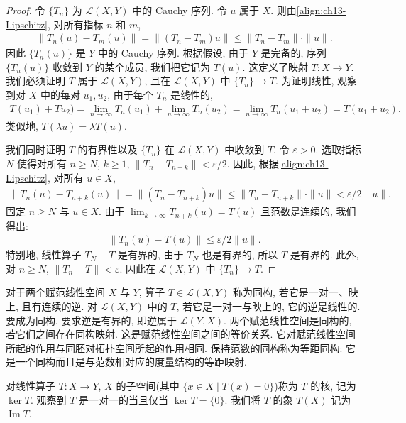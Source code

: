 \documentclass[../../main.tex]{subfiles}
\begin{document}
\begin{proof}
令 $\{T_{n}\}$ 为 $\mathcal{L}(X,Y)$ 中的 Cauchy 序列. 令 $u$ 属于 $X$. 则由\eqref{align:ch13-Lipschitz}, 对所有指标 $n$ 和 $m$,
\begin{align*}
\|T_{n}(u)-T_{m}(u)\|=\|(T_{n}-T_{m})u\|\leqslant\|T_{n}-T_{m}\|\cdot\|u\|.
\end{align*}
因此 $\{T_{n}(u)\}$ 是 $Y$ 中的 Cauchy 序列. 根据假设, 由于 $Y$ 是完备的, 序列 $\{T_{n}(u)\}$ 收敛到 $Y$ 的某个成员, 我们把它记为 $T(u)$. 这定义了映射 $T:X\to Y$. 我们必须证明 $T$ 属于 $\mathcal{L}(X,Y)$, 且在 $\mathcal{L}(X,Y)$ 中 $\{T_{n}\}\to T$. 为证明线性, 观察到对 $X$ 中的每对 $u_{1},u_{2}$, 由于每个 $T_{n}$ 是线性的,
\begin{align*}
T(u_{1})+Tu_{2})=\lim_{n\to\infty}T_{n}(u_{1})+\lim_{n\to\infty}T_{n}(u_{2})=\lim_{n\to\infty}T_{n}(u_{1}+u_{2})=T(u_{1}+u_{2}).
\end{align*}
类似地, $T(\lambda u)=\lambda T(u)$.

我们同时证明 $T$ 的有界性以及 $\{T_{n}\}$ 在 $\mathcal{L}(X,Y)$ 中收敛到 $T$. 令 $\varepsilon>0$. 选取指标 $N$ 使得对所有 $n\geqslant N$, $k\geqslant 1$, $\|T_{n}-T_{n+k}\|<\varepsilon/2$. 因此, 根据\eqref{align:ch13-Lipschitz}, 对所有 $u\in X$,
\begin{align*}
\|T_{n}(u)-T_{n+k}(u)\|=\|(T_{n}-T_{n+k})u\|\leqslant\|T_{n}-T_{n+k}\|\cdot\|u\|<\varepsilon/2\|u\|.
\end{align*}
固定 $n\geqslant N$ 与 $u\in X$. 由于 $\lim_{k\to\infty}T_{n+k}(u)=T(u)$ 且范数是连续的, 我们得出:
\begin{align*}
\|T_{n}(u)-T(u)\|\leqslant\varepsilon/2\|u\|.
\end{align*}
特别地, 线性算子 $T_{N}-T$ 是有界的, 由于 $T_{N}$ 也是有界的, 所以 $T$ 是有界的. 此外, 对 $n\geqslant N$, $\|T_{n}-T\|<\varepsilon$. 因此在 $\mathcal{L}(X,Y)$ 中 $\{T_{n}\}\to T$.
\end{proof}

对于两个赋范线性空间 $X$ 与 $Y$, 算子 $T\in\mathcal{L}(X,Y)$ 称为同构, 若它是一对一、映上, 且有连续的逆. 对 $\mathcal{L}(X,Y)$ 中的 $T$, 若它是一对一与映上的, 它的逆是线性的. 要成为同构, 要求逆是有界的, 即逆属于 $\mathcal{L}(Y,X)$. 两个赋范线性空间是同构的, 若它们之间存在同构映射. 这是赋范线性空间之间的等价关系. 它对赋范线性空间所起的作用与同胚对拓扑空间所起的作用相同. 保持范数的同构称为等距同构: 它是一个同构而且是与范数相对应的度量结构的等距映射.

对线性算子 $T:X\to Y$, $X$ 的子空间(其中 $\{x\in X\mid T(x)=0\}$)称为 $T$ 的核, 记为 $\ker T$. 观察到 $T$ 是一对一的当且仅当 $\ker T=\{0\}$. 我们将 $T$ 的象 $T(X)$ 记为 $\operatorname{Im}T$.
\end{document}
